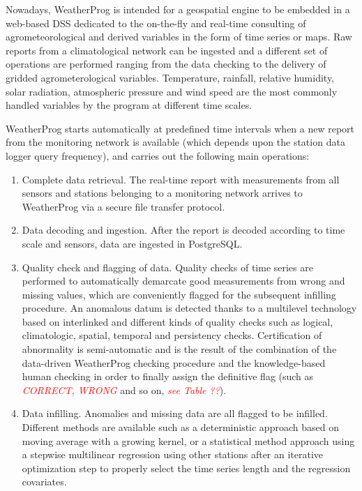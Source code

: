 \documentclass[authoryear,preprint,review,12pt]{elsarticle}
\newcommand{\note}[1]{\emph{\textcolor{red}{#1}}}
\begin{document}
Nowadays, WeatherProg is intended for a geospatial engine to be embedded in a web-based DSS dedicated to the on-the-fly and real-time consulting of agrometeorological and derived variables in the form of time series or maps.
Raw reports from a climatological network can be ingested and a different set of operations are performed ranging from the data checking to the delivery of gridded agrometerological variables.
Temperature, rainfall, relative humidity, solar radiation, atmospheric pressure and wind speed are the most commonly handled variables by the program at different time scales.

WeatherProg starts automatically at predefined time intervals when a new report from the monitoring network is available (which depends upon the station data logger query frequency), and carries out the following main operations:
\begin{enumerate}
    \item Complete data retrieval. The real-time report with measurements from all sensors and stations belonging to a monitoring network arrives to WeatherProg via a secure file transfer protocol.
    
    \item Data decoding and ingestion. After the report is decoded according to time scale and sensors, data are ingested in PostgreSQL.

    \item Quality check and flagging of data. Quality checks of time series are performed to automatically demarcate good measurements from wrong and missing values, which are conveniently flagged for the subsequent infilling procedure.
    An anomalous datum is detected thanks to a multilevel technology based on interlinked and different kinds of quality checks such as logical, climatologic, spatial, temporal and persistency checks. Certification of abnormality is semi-automatic and is the result of the combination of the data-driven WeatherProg checking procedure and the knowledge-based human checking in order to finally assign the definitive flag (such as \note{CORRECT, WRONG} and so on, \note{see Table ??}).
    
    \item Data infilling. Anomalies and missing data are all flagged to be %
    infilled.
    Different methods are available such as a deterministic approach based on moving average with a growing kernel, or a statistical method approach using a stepwise multilinear regression using other stations after an iterative optimization step to properly select the time series length and the regression covariates.
    

\end{enumerate}
\end{document}
